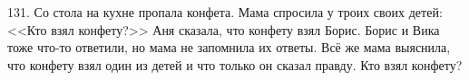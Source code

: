 131. Со стола на кухне пропала конфета. Мама спросила у троих своих детей: <<Кто взял конфету?>> Аня сказала, что конфету взял Борис. Борис и Вика тоже что-то ответили, но мама не запомнила их ответы. Всё же мама выяснила, что конфету взял один из детей и что только он сказал правду. Кто взял конфету?\\
